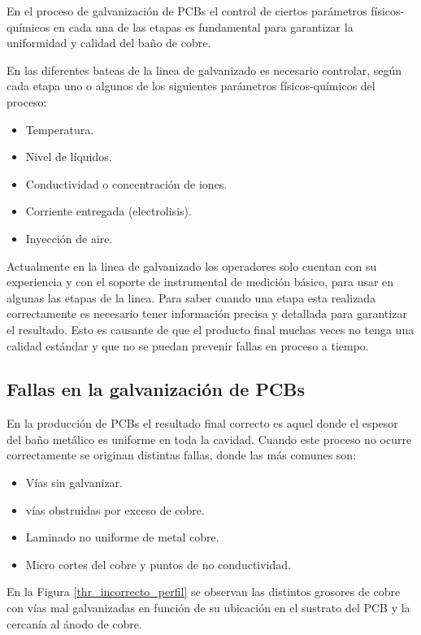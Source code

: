 En el proceso de galvanización de PCBs el control de ciertos parámetros físicos-químicos en cada una de las etapas es fundamental para garantizar la uniformidad y calidad del baño de cobre. 

En las diferentes bateas de la linea de galvanizado es necesario controlar, según cada etapa uno o algunos de los siguientes parámetros físicos-químicos del proceso:
\begin{itemize}
	\item Temperatura.
	\item Nivel de líquidos.
	\item Conductividad o concentración de iones.
	\item Corriente entregada (electrolisis).
	\item Inyección de aire.
\end{itemize}

Actualmente en la linea de galvanizado los operadores solo cuentan con su experiencia y con el soporte de instrumental de medición básico, para usar en algunas las etapas de la linea. Para saber cuando una etapa esta realizada correctamente es necesario tener información precisa y detallada para garantizar el resultado. Esto es causante de que el producto final muchas veces no tenga una calidad estándar y que no se puedan prevenir fallas en proceso a tiempo.

\subsection{ Fallas en la galvanización de PCBs }

En la producción de PCBs el resultado final correcto es aquel donde el espesor del baño metálico es uniforme en toda la cavidad. Cuando este proceso no ocurre correctamente se originan distintas fallas, donde las más comunes son:
\begin{itemize}
	\item Vías sin galvanizar.
	\item vías obstruidas por exceso de cobre.
	\item Laminado no uniforme de metal cobre.
	\item Micro cortes del cobre y puntos de no conductividad.
\end{itemize}

En la Figura \ref{thr_incorrecto_perfil} se observan las distintos grosores de cobre con vías mal galvanizadas en función de su ubicación en el sustrato del PCB y la cercanía al ánodo de cobre.

